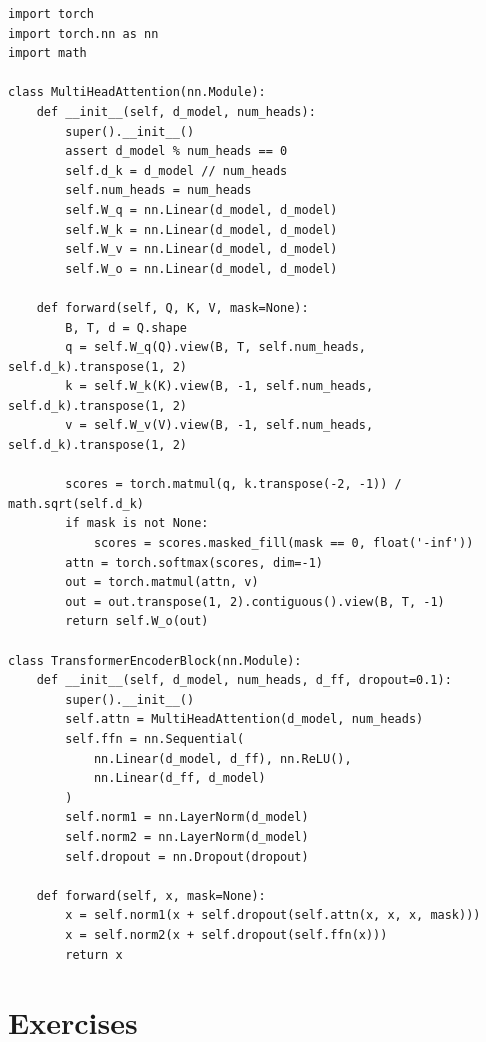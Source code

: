\begin{codeblock}[title=\textbf{Transformer encoder block in PyTorch}]
\begin{verbatim}
import torch
import torch.nn as nn
import math

class MultiHeadAttention(nn.Module):
    def __init__(self, d_model, num_heads):
        super().__init__()
        assert d_model % num_heads == 0
        self.d_k = d_model // num_heads
        self.num_heads = num_heads
        self.W_q = nn.Linear(d_model, d_model)
        self.W_k = nn.Linear(d_model, d_model)
        self.W_v = nn.Linear(d_model, d_model)
        self.W_o = nn.Linear(d_model, d_model)

    def forward(self, Q, K, V, mask=None):
        B, T, d = Q.shape
        q = self.W_q(Q).view(B, T, self.num_heads, self.d_k).transpose(1, 2)
        k = self.W_k(K).view(B, -1, self.num_heads, self.d_k).transpose(1, 2)
        v = self.W_v(V).view(B, -1, self.num_heads, self.d_k).transpose(1, 2)

        scores = torch.matmul(q, k.transpose(-2, -1)) / math.sqrt(self.d_k)
        if mask is not None:
            scores = scores.masked_fill(mask == 0, float('-inf'))
        attn = torch.softmax(scores, dim=-1)
        out = torch.matmul(attn, v)
        out = out.transpose(1, 2).contiguous().view(B, T, -1)
        return self.W_o(out)

class TransformerEncoderBlock(nn.Module):
    def __init__(self, d_model, num_heads, d_ff, dropout=0.1):
        super().__init__()
        self.attn = MultiHeadAttention(d_model, num_heads)
        self.ffn = nn.Sequential(
            nn.Linear(d_model, d_ff), nn.ReLU(),
            nn.Linear(d_ff, d_model)
        )
        self.norm1 = nn.LayerNorm(d_model)
        self.norm2 = nn.LayerNorm(d_model)
        self.dropout = nn.Dropout(dropout)

    def forward(self, x, mask=None):
        x = self.norm1(x + self.dropout(self.attn(x, x, x, mask)))
        x = self.norm2(x + self.dropout(self.ffn(x)))
        return x
\end{verbatim}
\end{codeblock}

\section{Exercises}
\label{sec:att:exercises}

